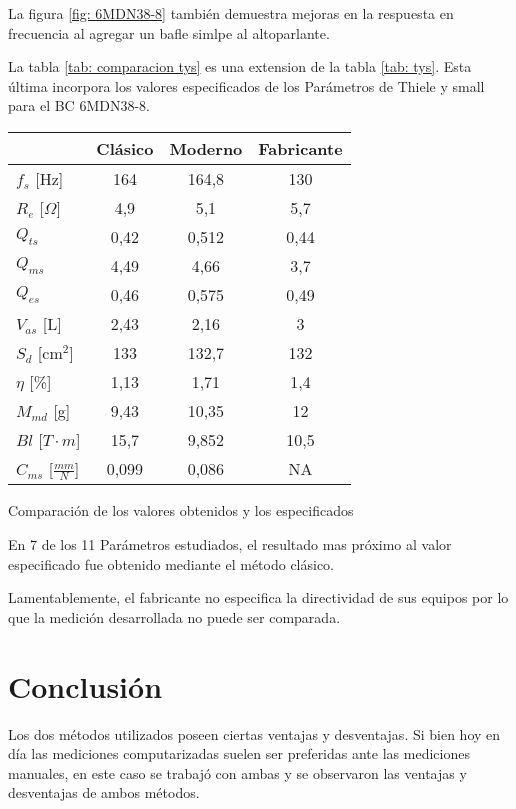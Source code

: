 \documentclass[]{article}
\makeatletter
\newcommand{\tabla}[4]{
\vspace{0.3 cm}
\begin{tablehere}
\begin{center}
\begin{tabular}{#1}
#2
\end{tabular}
\caption{#3}
\label{#4}
\end{center}
\end{tablehere}
\vspace{0.3 cm}
}
\newenvironment{tablehere}    %
  {\def\@captype{table}}    %

  {}              %
\makeatother
\begin{document}
\begin{multicols}{2}
La figura \ref{fig: 6MDN38-8} también demuestra mejoras en la respuesta en frecuencia
al agregar un bafle simlpe al altoparlante.


La tabla \ref{tab: comparacion tys} es una extension de la tabla \ref{tab: tys}.
Esta última incorpora los valores especificados de los Parámetros de Thiele y small
para el BC 6MDN38-8.

\tabla
{|l|c|c|c|}
{
\hline
 & Clásico & Moderno & Fabricante\\
\hline
$f_s$ [Hz] & 164 & 164,8 & 130 \\
\hline
$R_e$ [$\Omega$] & 4,9 & 5,1 & 5,7  \\
\hline
$Q_{ts}$  & 0,42 & 0,512 & 0,44 \\
\hline
$Q_{ms}$  & 4,49 & 4,66 & 3,7 \\
\hline
$Q_{es}$    & 0,46 & 0,575 & 0,49 \\
\hline
$V_{as}$ [L] & 2,43 & 2,16 & 3 \\
\hline
$S_d$ [cm$^2$] & 133 & 132,7 & 132 \\
\hline
$\eta$ [\%{}] & 1,13 & 1,71 & 1,4 \\
\hline
$M_{md}$ [g] & 9,43 & 10,35 & 12\\
\hline
$Bl$ [$T \cdot m$] & 15,7 & 9,852 & 10,5\\
\hline
$C_{ms}$ [$\frac{mm}{N}$] & 0,099 & 0,086 & NA \\
\hline
}
{Comparación de los valores obtenidos y los especificados}
{tab: comparacion tys}

En 7 de los 11 Parámetros estudiados, el resultado mas próximo al valor especificado
fue obtenido mediante el método clásico.

Lamentablemente, el fabricante no especifica la directividad de sus equipos
por lo que la medición desarrollada no puede ser comparada.




\section{Conclusión}
Los dos métodos utilizados poseen ciertas ventajas y desventajas. Si bien hoy en día
las mediciones computarizadas suelen ser preferidas ante las mediciones manuales,
en este caso se trabajó con ambas y se observaron las ventajas y desventajas de
ambos métodos.


\end{multicols}
\end{document}
